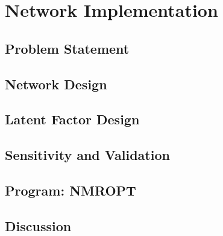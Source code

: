 
\chapter{Network Implementation}
\label{ch:implement}

\section{Problem Statement}
\label{sec:prob}

\section{Network Design}
\label{sec:networkd}

\section{Latent Factor Design}
\label{sec:factord}

\section{Sensitivity and Validation}
\label{sec:valid}

\section{Program: NMROPT}
\label{sec:nmropt}

\section{Discussion}
\label{sec:discuss04}